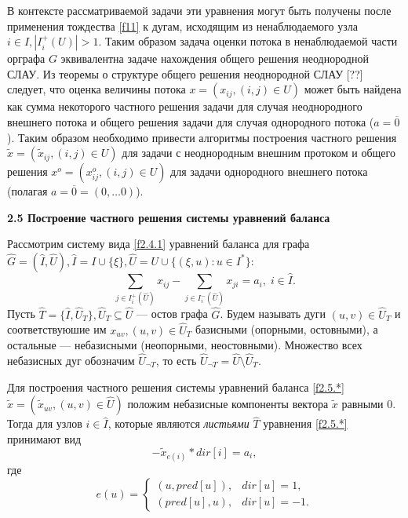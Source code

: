 \documentclass[14pt]{extarticle}%
\begin{document}
В контексте рассматриваемой задачи эти уравнения могут быть получены после применения тождества \eqref{f11} к дугам, исходящим из ненаблюдаемого узла $i\in I, |I^+_i(U)|>1$. Таким образом задача оценки потока в ненаблюдаемой части орграфа $G$ эквивалентна задаче нахождения общего решения неоднородной СЛАУ. Из теоремы о структуре общего решения неоднородной СЛАУ [??] следует, что оценка величины потока $x=(x_{ij}, (i,j)\in U)$ может быть найдена как сумма некоторого частного решения задачи для случая неоднородного внешнего потока и общего решения задачи для случая однородного потока ($a=\overline{0}$). Таким образом необходимо привести алгоритмы построения частного решения $\widetilde{x}=(\widetilde{x}_{ij}, (i,j)\in U)$ для задачи с неоднородным внешним протоком и общего решения $x^o=(x^o_{ij}, (i,j)\in U)$ для задачи однородного внешнего потока (полагая $a=\overline{0}=(0, \ldots 0)$).

\textbf{2.5 Построение частного решения системы уравнений баланса}

Рассмотрим систему вида \eqref{f2.4.1} уравнений баланса для графа $\widehat{G}=(\widehat{I},\widehat{U}), \widehat{I}=I\cup\{\xi\}, \widehat{U}=U\cup\{(\xi,u):u\in I^*\}$:
\begin{equation}\label{f2.5.*}
    \sum_{j\in I^+_i(\widehat{U})} x_{ij}-\sum_{j\in I^-_i(\widehat{U})}x_{ji}=a_i,\; i\in \widehat{I}.
\end{equation}
 Пусть $\widehat{T}=\{\widehat{I},\widehat{U}_T\}, \widehat{U}_T\subseteq \widehat{U}$ --- остов графа $\widehat{G}$. Будем называть дуги $(u,v)\in \widehat{U}_T$ и соответствуюшие им $x_{uv}, (u,v)\in \widehat{U}_T$ базисными (опорными, остовными), а остальные --- небазисными (неопорными, неостовными). Множество всех небазисных дуг обозначим $\widehat{U}_{\neg T}$, то есть $\widehat{U}_{\neg T}=\widehat{U}\setminus \widehat{U}_T$. 

Для построения частного решения системы уравнений баланса \eqref{f2.5.*} $\widetilde x=(\widetilde{x}_{uv},(u,v)\in \widehat{U})$ положим небазисные компоненты вектора $\widetilde{x}$ равными $0$. Тогда для узлов $i\in \widehat{I}$, которые являются {\it листьями} $\widehat{T}$ уравнения \eqref{f2.5.*} принимают вид 
\begin{equation}\label{f241}
-\widetilde{x}_{e(i)}*dir[i]=a_i,
\end{equation}
где 
\begin{equation*}
e(u)=\left\{
\begin{matrix}
(u, pred[u]),& dir[u]=1,\\
(pred[u],u),& dir[u]=-1.
\end{matrix}
\right.
\end{equation*}
\end{document}
